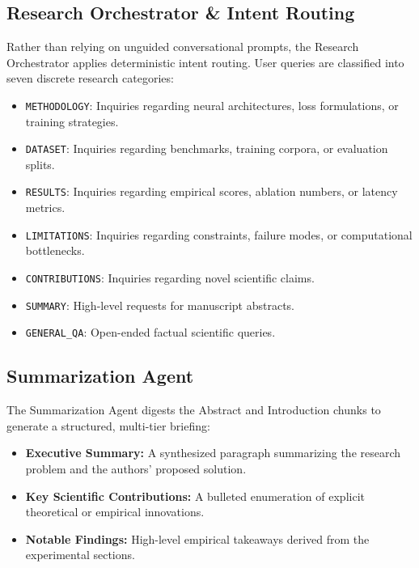 \documentclass[conference]{IEEEtran}
\begin{document}
\subsection{Research Orchestrator \& Intent Routing}
Rather than relying on unguided conversational prompts, the Research Orchestrator applies deterministic intent routing. User queries are classified into seven discrete research categories:
\begin{itemize}
    \item \texttt{METHODOLOGY}: Inquiries regarding neural architectures, loss formulations, or training strategies.
    \item \texttt{DATASET}: Inquiries regarding benchmarks, training corpora, or evaluation splits.
    \item \texttt{RESULTS}: Inquiries regarding empirical scores, ablation numbers, or latency metrics.
    \item \texttt{LIMITATIONS}: Inquiries regarding constraints, failure modes, or computational bottlenecks.
    \item \texttt{CONTRIBUTIONS}: Inquiries regarding novel scientific claims.
    \item \texttt{SUMMARY}: High-level requests for manuscript abstracts.
    \item \texttt{GENERAL\_QA}: Open-ended factual scientific queries.
\end{itemize}

\subsection{Summarization Agent}
The Summarization Agent digests the Abstract and Introduction chunks to generate a structured, multi-tier briefing:
\begin{itemize}
    \item \textbf{Executive Summary:} A synthesized paragraph summarizing the research problem and the authors' proposed solution.
    \item \textbf{Key Scientific Contributions:} A bulleted enumeration of explicit theoretical or empirical innovations.
    \item \textbf{Notable Findings:} High-level empirical takeaways derived from the experimental sections.
\end{itemize}
\end{document}
